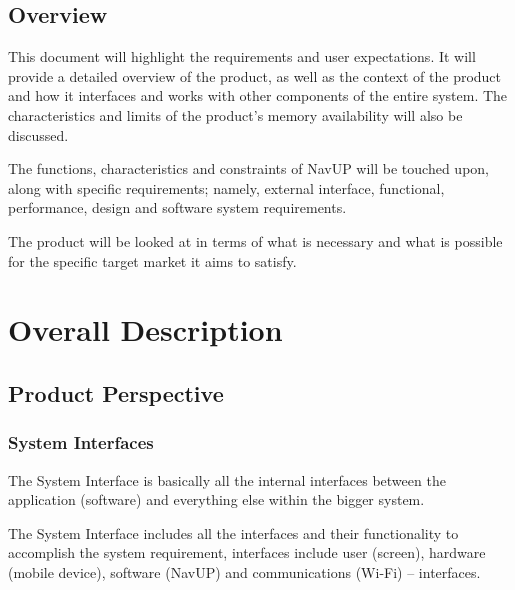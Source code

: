 \documentclass[12pt]{article}
\begin{document}
	\subsection{Overview}
	This document will highlight the requirements and user expectations. It will provide a detailed overview of the product, as well as the context of the product and how it interfaces and works with other components of the entire system. The characteristics and limits of the product’s memory availability will also be discussed.
	
	\vspace{\baselineskip}
	The functions, characteristics and constraints of NavUP will be touched upon, along with specific requirements; namely, external interface, functional, performance, design and software system requirements.
	
	\vspace{\baselineskip}
	The product will be looked at in terms of what is necessary and what is possible for the specific target market it aims to satisfy.
	

\section{Overall Description}
	
	\subsection{Product Perspective}
		
		\subsubsection{System Interfaces}
		The System Interface is basically all the internal interfaces between the application (software) and everything else within the bigger system.
		
		The System Interface includes all the interfaces and their functionality to accomplish the system requirement, interfaces include user (screen), hardware (mobile device), software (NavUP) and communications (Wi-Fi) – interfaces.
		
\end{document}
